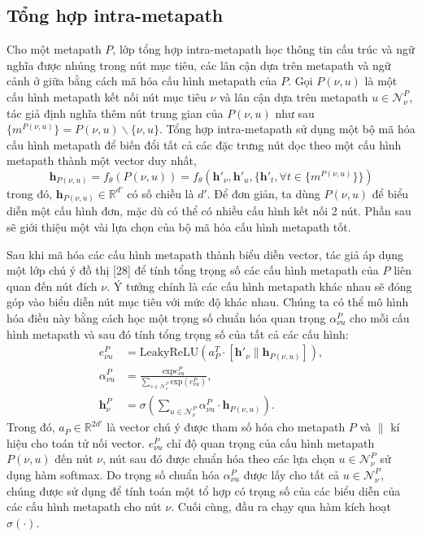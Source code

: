 \subsection{Tổng hợp intra-metapath}
Cho một metapath $P$, lớp tổng hợp intra-metapath học thông tin cấu trúc và ngữ nghĩa được nhúng trong nút mục tiêu, các lân cận dựa trên metapath và ngữ cảnh ở giữa bằng cách mã hóa cấu hình metapath của $P$. Gọi $P(\nu, u)$ là một cấu hình metapath kết nối nút mục tiêu $\nu$ và lân cận dựa trên metapath $u \in \pmb{\mathcal{N}}^P_{\nu}$, tác giả định nghĩa thêm  nút trung gian của $P(\nu, u)$ như sau $\{ m^{P(\nu, u)} \} = P(\nu, u) \backslash \{ \nu, u \}$. Tổng hợp intra-metapath sử dụng một bộ mã hóa cấu hình metapath để biến đổi tất cả các đặc trưng nút dọc theo một cấu hình metapath thành một vector duy nhất,
\begin{equation}
  \mathbf{h}_{P(\nu, u)} = f_{\theta} (P(\nu, u)) = f_{\theta} \left( \mathbf{h'}_{\nu}, \mathbf{h'}_{u}, \{ \mathbf{h'}_{t}, \forall t \in \{m^{P(\nu, u)}\} \} \right)
\end{equation}
trong đó, $\mathbf{h}_{P(\nu, u)} \in \mathbb{R}^{d'}$ có số chiều là $d'$. Để đơn giản, ta dùng $P(\nu, u)$ để biểu diễn một cấu hình đơn, mặc dù có thể có nhiều cấu hình kết nối 2 nút. Phần sau sẽ giới thiệu một vài lựa chọn của bộ mã hóa cấu hình metapath tốt.

Sau khi mã hóa các cấu hình metapath thành biểu diễn vector, tác giả áp dụng một lớp chú ý đồ thị [28] để  tính tổng trọng số các cấu hình metapath của $P$ liên quan đến nút đích $\nu$. Ý tưởng chính là các cấu hình metapath khác nhau sẽ đóng góp vào biểu diễn nút mục tiêu với mức độ khác nhau. Chúng ta có thể mô hình hóa điều này bằng cách học một trọng số chuẩn hóa quan trọng $\alpha^P_{\nu u}$ cho mỗi cấu hình metapath và sau đó tính tổng trọng số của tất cả các cấu hình:
\begin{equation}
  \begin{split}
    e^P_{\nu u} &= \text{LeakyReLU} (a^T_P \cdot [\mathbf{h'}_{\nu}\parallel \mathbf{h}_{P(\nu, u)}]), \\
  \alpha ^P_{\nu u} &= \frac{\text{exp}{e^P_{\nu u}}}{\sum _{s \in \pmb{\mathcal{N}}^P_{\nu}} \text{exp} (e^P_{\nu u})}, \\
  \mathbf{h}^P_{\nu} &= \sigma \left( \sum_{u \in \pmb{\mathcal{N}}^P_{\nu}} \alpha ^P_{\nu u} \cdot \mathbf{h}_{P(\nu, u)} \right).
  \end{split}
\end{equation}
Trong đó, $a_P \in \mathbb{R}^{2d'}$ là vector chú ý được tham số hóa cho metapath $P$ và $\parallel$ kí hiệu cho toán tử nối vector. $e^P_{\nu u}$ chỉ độ quan trọng của cấu hình metapath $P(\nu, u)$ đến nút $\nu$, nút sau đó được chuẩn hóa theo các lựa chọn $u \in \pmb{\mathcal{N}}^P_{\nu}$ sử dụng hàm softmax. Do trọng số chuẩn hóa $\alpha ^P_{\nu u}$ được lấy cho tất cả $u \in \pmb{\mathcal{N}}^P_{\nu}$, chúng được sử dụng để tính toán một tổ hợp có trọng số của các biểu diễn của các cấu hình metapath cho nút $\nu$. Cuối cùng, đầu ra chạy qua hàm kích hoạt $\sigma (\cdot)$.

